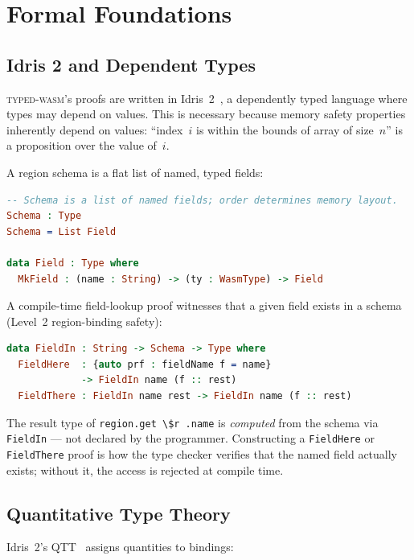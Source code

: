 \documentclass[11pt,a4paper]{article}
\newcommand{\typedwasm}{\textsc{typed-wasm}}
\begin{document}
\section{Formal Foundations}
\label{sec:formal}

\subsection{Idris 2 and Dependent Types}
\label{sec:idris}

\typedwasm{}'s proofs are written in Idris~2~\cite{brady2021}, a
dependently typed language where types may depend on values.  This is
necessary because memory safety properties inherently depend on values:
``index~$i$ is within the bounds of array of size~$n$'' is a proposition
over the value of~$i$.

A region schema is a flat list of named, typed fields:

\begin{lstlisting}[language=Idris]
-- Schema is a list of named fields; order determines memory layout.
Schema : Type
Schema = List Field

data Field : Type where
  MkField : (name : String) -> (ty : WasmType) -> Field
\end{lstlisting}

A compile-time field-lookup proof witnesses that a given field exists
in a schema (Level~2 region-binding safety):

\begin{lstlisting}[language=Idris]
data FieldIn : String -> Schema -> Type where
  FieldHere  : {auto prf : fieldName f = name}
             -> FieldIn name (f :: rest)
  FieldThere : FieldIn name rest -> FieldIn name (f :: rest)
\end{lstlisting}

The result type of \lstinline{region.get \$r .name} is \emph{computed}
from the schema via \lstinline{FieldIn} --- not declared by the programmer.
Constructing a \lstinline{FieldHere} or \lstinline{FieldThere} proof is
how the type checker verifies that the named field actually exists;
without it, the access is rejected at compile time.

\subsection{Quantitative Type Theory}
\label{sec:qtt}

Idris~2's QTT~\cite{atkey2018,mcbride2016} assigns quantities to
bindings:
\end{document}
